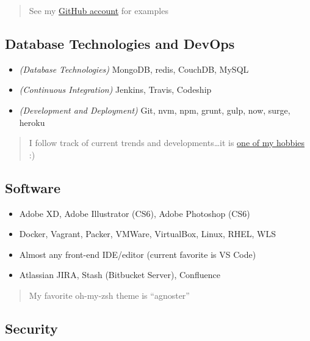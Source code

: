 \documentclass[10pt]{article}
\def\tightlist{}
\begin{document}
\begin{quote}
See my \href{https://github.com/jhwohlgemuth}{GitHub account} for
examples
\end{quote}

\hypertarget{database-technologies-and-devops}{%
\subsection{Database Technologies and
DevOps}\label{database-technologies-and-devops}}

\begin{itemize}
\tightlist
\item
  \emph{(Database Technologies)} MongoDB, redis, CouchDB, MySQL
\item
  \emph{(Continuous Integration)} Jenkins, Travis, Codeship
\item
  \emph{(Development and Deployment)} Git, nvm, npm, grunt, gulp, now,
  surge, heroku
\end{itemize}

\begin{quote}
I follow track of current trends and developments\ldots{}it is
\href{https://twitter.com/jhwohlgemuth}{one of my hobbies} :)
\end{quote}

\hypertarget{software}{%
\subsection{Software}\label{software}}

\begin{itemize}
\tightlist
\item
  Adobe XD, Adobe Illustrator (CS6), Adobe Photoshop (CS6)
\item
  Docker, Vagrant, Packer, VMWare, VirtualBox, Linux, RHEL, WLS
\item
  Almost any front-end IDE/editor (current favorite is VS Code)
\item
  Atlassian JIRA, Stash (Bitbucket Server), Confluence
\end{itemize}

\begin{quote}
My favorite oh-my-zsh theme is ``agnoster''
\end{quote}

\hypertarget{security}{%
\subsection{Security}\label{security}}
\end{document}
